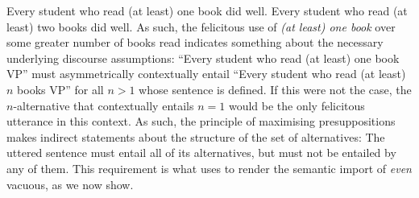 \pex[nopreamble=true]\label{ex:maxpresup2}%
\a{}\ljudge{\#} Every student who read (at least) one book did well.
\a{} Every student who read (at least) two books did well.
\xe
As such, the felicitous use of \textit{(at least) one book} over some greater number of books read indicates something about the necessary underlying discourse assumptions: \enquote{Every student who read (at least) one book VP} must asymmetrically contextually entail \enquote{Every student who read (at least) $n$ books VP} for all $n>1$ whose sentence is defined. If this were not the case, the $n$-alternative that contextually entails $n=1$ would be the only felicitous utterance in this context. As such, the principle of maximising presuppositions makes indirect statements about the structure of the set of alternatives: The uttered sentence must entail all of its alternatives, but must not be entailed by any of them. This requirement is what \textcite{Crnic2014-dogma} uses to render the semantic import of \textit{even} vacuous, as we now show.

